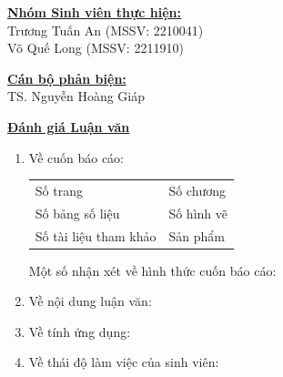 \documentclass[12pt,a4paper]{article}
\begin{document}
\vspace{0.3cm}

\noindent
\begin{minipage}[t]{0.55\textwidth}
    \underline{\textbf{Nhóm Sinh viên thực hiện:}} \\[0.1cm]
    {\small Trương Tuấn An (MSSV: 2210041)}\\
    {\small Võ Quế Long (MSSV: 2211910)}
\end{minipage}
\hfill
\begin{minipage}[t]{0.4\textwidth}
    \underline{\textbf{Cán bộ phản biện:}} \\[0.1cm]
    {\small TS. Nguyễn Hoàng Giáp}
\end{minipage}

\vspace{0.4cm}

\noindent \underline{\textbf{Đánh giá Luận văn}}
\begin{enumerate}[label=\arabic*., leftmargin=0.6cm]
    \item \small Về cuốn báo cáo: \\
    \vspace{-0.2cm}
    \begin{tabular}{p{} p{}}
        Số trang \dotfill & Số chương \dotfill \\
        Số bảng số liệu \dotfill & Số hình vẽ \dotfill \\
        Số tài liệu tham khảo \dotfill & Sản phẩm \dotfill
    \end{tabular}
    
    \vspace{0.2cm}
    Một số nhận xét về hình thức cuốn báo cáo: \dotfill \\
    \dotfill
    
    \vspace{0.2cm}
    \item Về nội dung luận văn: \dotfill \\
    \dotfill
    
    \vspace{0.2cm}
    \item Về tính ứng dụng: \dotfill \\
    \dotfill
    
    \vspace{0.2cm}
    \item Về thái độ làm việc của sinh viên: \dotfill \\
    \dotfill
\end{enumerate}
\end{document}
